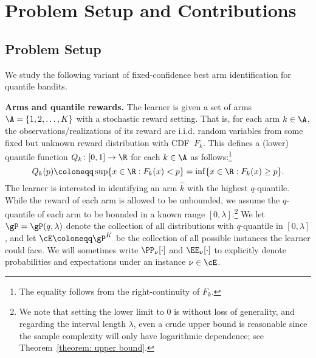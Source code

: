 \section{Problem Setup and Contributions}
\subsection{Problem Setup}
\label{sec: setup}
We study the following variant of fixed-confidence best arm identification for quantile bandits. 

\textbf{Arms and quantile rewards.}
The learner is given a set of arms $\A = \{1, 2, \dots, K\}$ with a stochastic reward setting. That is, for each arm $k \in \A$, the observations/realizations of its reward are i.i.d. random variables from some fixed but unknown reward distribution with CDF~$F_k$. This defines a (lower) quantile function $Q_k \colon [0,1] \to \R$ for each $k \in \A$ as follows:\footnote{The equality follows from the right-continuity of $F_k$.}
\begin{equation}
    Q_k(p) \coloneqq \sup \{ x  \in \R : F_k(x) < p \} 
    =
    \inf \{ x \in \R : F_k(x) \ge p \}.
\end{equation} 
The learner is interested in identifying an arm $\hat{k}$ with the highest $q$-quantile.
While the reward of each arm is allowed to be unbounded, 
we assume the $q$-quantile of each arm to be bounded in a known range $[0, \lambda]$.\footnote{We note that setting the lower limit to 0 is without loss of generality, and regarding the interval length $\lambda$, even a crude upper bound is reasonable since the sample complexity will only have logarithmic dependence; see Theorem~\ref{theorem: upper bound}.}
We let $\gP = \gP(q, \lambda)$ denote the collection of all distributions with $q$-quantile in $[0, \lambda]$, and let $\cE \coloneqq \gP
^K$ be the collection of all possible instances the learner could face.  We will sometimes write $\PP_{\nu}[\cdot]$ and $\EE_{\nu}[\cdot]$ to explicitly denote probabilities and expectations under an instance $\nu \in \cE$.

